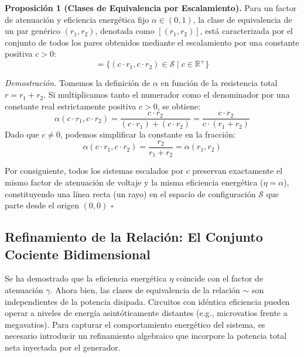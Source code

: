 \documentclass[11pt, a4paper]{article}
\theoremstyle{definition}
\theoremstyle{plain}
\theoremstyle{plain}
\theoremstyle{remark}
\theoremstyle{remark}
\theoremstyle{remark}
\begin{document}
\vspace{0.2cm}
\textbf{Proposición 1 (Clases de Equivalencia por Escalamiento).} 
Para un factor de atenuación y eficiencia energética fijo $\alpha \in (0, 1)$, la clase de equivalencia de un par genérico $(r_1, r_2)$, denotada como $[(r_1, r_2)]$, está caracterizada por el conjunto de todos los pares obtenidos mediante el escalamiento por una constante positiva $c > 0$:
\begin{equation}
	[(r_1, r_2)] = \{ (c \cdot r_1, c \cdot r_2) \in \mathcal{S} \mid c \in \mathbb{R}^+ \}
\end{equation}

\textit{Demostración.} 
Tomemos la definición de $\alpha$ en función de la resistencia total $r = r_1 + r_2$. Si multiplicamos tanto el numerador como el denominador por una constante real estrictamente positiva $c > 0$, se obtiene:
\begin{equation*}
	\alpha(c \cdot r_1, c \cdot r_2) = \frac{c \cdot r_2}{(c \cdot r_1) + (c \cdot r_2)} = \frac{c \cdot r_2}{c \cdot (r_1 + r_2)}
\end{equation*}
Dado que $c \neq 0$, podemos simplificar la constante en la fracción:
\begin{equation*}
	\alpha(c \cdot r_1, c \cdot r_2) = \frac{r_2}{r_1 + r_2} = \alpha(r_1, r_2)
\end{equation*}


Por consiguiente, todos los sistemas escalados por $c$ preservan exactamente el mismo factor de atenuación de voltaje y la misma eficiencia energética ($\eta = \alpha$), constituyendo una línea recta (un rayo) en el espacio de configuración $\mathcal{S}$ que parte desde el origen $(0,0)$  \hfill $\square$


\subsection{Refinamiento de la Relación: El Conjunto Cociente Bidimensional}

Se ha demostrado que la eficiencia energética $\eta$ coincide con el factor de atenuación $\gamma$.  Ahora bien, las clases de equivalencia de la relación $\sim$ son independientes de la potencia disipada. Circuitos con idéntica eficiencia pueden operar a niveles de energía asintóticamente distantes (e.g., microvatios frente a megavatios). Para capturar el comportamiento energético del sistema, es necesario introducir un refinamiento algebraico que incorpore la potencia total neta inyectada por el generador.
\end{document}
